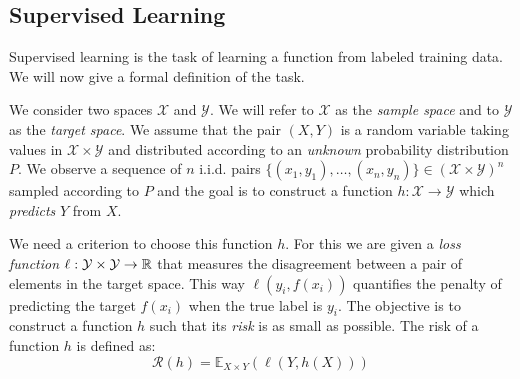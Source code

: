 



\subsection{Supervised Learning}\label{subsec:supervised_learning}

Supervised learning is the task of learning a function from labeled training data. We will now give a formal definition of the task. 

We consider two spaces $\mathcal{X}$ and $\mathcal{Y}$. We will refer to $\mathcal{X}$ as the \emph{sample space} and to $\mathcal{Y}$ as the \emph{target space}. We assume that the pair $(X, Y)$ is a random variable taking values in $\mathcal{X} \times \mathcal{Y}$ and distributed according to an \emph{unknown} probability distribution $P$.  We observe a sequence of $n$ i.i.d. pairs  $\{(x_1, y_1), \ldots, (x_n, y_n)\} \in (\mathcal{X} \times \mathcal{Y})^n$ sampled according to $P$ and the goal is to construct  a function $h: \mathcal{X} \to \mathcal{Y}$ which \emph{predicts} $Y$ from $X$.

We need a criterion to choose this function $h$. For this we are given a \emph{loss function} $\ell: \mathcal{Y} \times \mathcal{Y} \to {\mathbb R}$ that measures the disagreement between a pair of elements in the target space. This way $\ell(y_i, f(x_i))$ quantifies the penalty of predicting the target $f(x_i)$ when the true label is $y_i$. The objective is to construct a function $h$ such that its \emph{risk} is as small as possible. The risk of a function $h$ is defined as:
$$
\mathcal{R}(h) = \mathbb{E}_{X \times Y}(\ell(Y, h(X)))
$$

